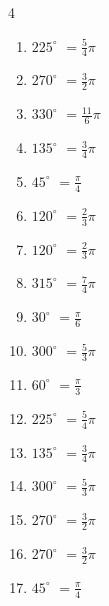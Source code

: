 \begin{multicols}{4}
\begin{enumerate}
  \item $\displaystyle 225^{\circ}$
        $\displaystyle =\frac{5}{4}\pi$

  \item $\displaystyle 270^{\circ}$
        $\displaystyle =\frac{3}{2}\pi$

  \item $\displaystyle 330^{\circ}$
        $\displaystyle =\frac{11}{6}\pi$

  \item $\displaystyle 135^{\circ}$
        $\displaystyle =\frac{3}{4}\pi$

  \item $\displaystyle 45^{\circ}$
        $\displaystyle =\frac{\pi}{4}$

  \item $\displaystyle 120^{\circ}$
        $\displaystyle =\frac{2}{3}\pi$

  \item $\displaystyle 120^{\circ}$
        $\displaystyle =\frac{2}{3}\pi$

\columnbreak %

  \item $\displaystyle 315^{\circ}$
        $\displaystyle =\frac{7}{4}\pi$

  \item $\displaystyle 30^{\circ}$
        $\displaystyle =\frac{\pi}{6}$

  \item $\displaystyle 300^{\circ}$
        $\displaystyle =\frac{5}{3}\pi$

  \item $\displaystyle 60^{\circ}$
        $\displaystyle =\frac{\pi}{3}$

  \item $\displaystyle 225^{\circ}$
        $\displaystyle =\frac{5}{4}\pi$

  \item $\displaystyle 135^{\circ}$
        $\displaystyle =\frac{3}{4}\pi$

  \item $\displaystyle 300^{\circ}$
        $\displaystyle =\frac{5}{3}\pi$

  \item $\displaystyle 270^{\circ}$
        $\displaystyle =\frac{3}{2}\pi$

  \item $\displaystyle 270^{\circ}$
        $\displaystyle =\frac{3}{2}\pi$

  \item $\displaystyle 45^{\circ}$
        $\displaystyle =\frac{\pi}{4}$


\end{enumerate}
\end{multicols}
